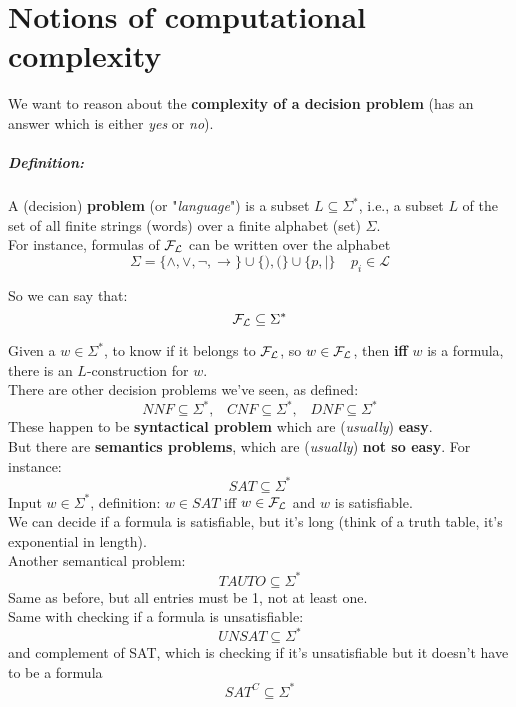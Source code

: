 
	\chapter{Notions of computational complexity}

	We want to reason about the \textbf{complexity of a decision problem} (has an answer which is either \textit{yes} or \textit{no}).\\

	\paragraph{Definition:} A (decision) \textbf{problem} (or "\textit{language}") is a subset $L \subseteq \Sigma^\ast$, i.e., a subset $L$ of the set of all finite strings (words) over a finite alphabet (set) $\Sigma$.\\

	For instance, formulas of $\mathcal{F}_\mathcal{L}$ can be written over the alphabet
	$$ \Sigma = \{\wedge, \vee, \neg, \rightarrow\} \cup \{),(\} \cup \{p, |\} \;\;\;\; p_i \in \mathcal{L} $$

	So we can say that:
	$$ \mathcal{F}_\mathcal{L} \subseteq \Sigma^\ast $$

	Given a $w \in \Sigma^\ast$, to know if it belongs to $\mathcal{F}_\mathcal{L}$, so $w \in \mathcal{F}_\mathcal{L}$, then \textbf{iff} $w$ is a formula, there is an $L$-construction for $w$.\\

	There are other decision problems we've seen, as defined:
	$$ NNF \subseteq \Sigma^\ast,  \;\;\; CNF \subseteq \Sigma^\ast,  \;\;\; DNF \subseteq \Sigma^\ast $$
	These happen to be \textbf{syntactical problem} which are (\textit{usually}) \textbf{easy}.\\

	But there are \textbf{semantics problems}, which are (\textit{usually}) \textbf{not so easy}. For instance:
	$$ SAT \subseteq \Sigma^\ast$$
	Input $w \in \Sigma^\ast$, definition: $w \in SAT$ iff $w \in \mathcal{F}_\mathcal{L}$ and $w$ is satisfiable.\\
	We can decide if a formula is satisfiable, but it's long (think of a truth table, it's exponential in length).\\

	Another semantical problem:
	$$ TAUTO \subseteq \Sigma^\ast$$
	Same as before, but all entries must be 1, not  at least one.\\

	Same with checking if a formula is unsatisfiable:
	$$ UNSAT \subseteq \Sigma^\ast $$
	and complement of SAT, which is checking if it's unsatisfiable but it doesn't have to be a formula
	$$ SAT^C \subseteq \Sigma^\ast $$


